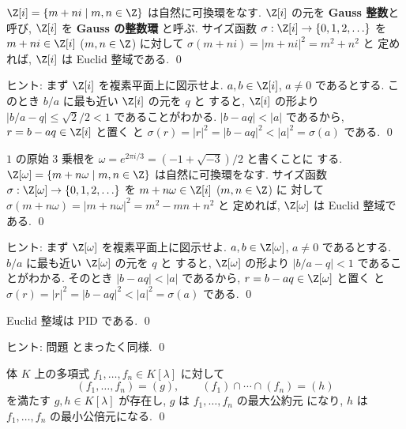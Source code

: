 \documentclass[12pt,twoside]{jarticle}
\begin{document}

\begin{question}
\label{q:Z[i]-Euclidean}
  $\Z[i]=\{m+ni\mid m,n\in\Z\}$ は自然に可換環をなす.
  $\Z[i]$ の元を {\bf Gauss 整数}と呼び, 
  $\Z[i]$ を {\bf Gauss の整数環} と呼ぶ.
  サイズ函数 $\sigma:\Z[i]\to\{0,1,2,\ldots\}$ 
  を $m+ni\in\Z[i]$ ($m,n\in\Z$) に対して $\sigma(m+ni)=|m+ni|^2=m^2+n^2$ と
  定めれば, $\Z[i]$ は Euclid 整域である.
  \qed
\end{question}

\noindent
ヒント: まず $\Z[i]$ を複素平面上に図示せよ.
$a,b\in\Z[i]$, $a\ne 0$ であるとする. 
このとき $b/a$ に最も近い $\Z[i]$ の元を $q$ と
すると, $\Z[i]$ の形より $|b/a - q|\le \sqrt{2}/2<1$ であることがわかる.
$|b-aq|<|a|$ であるから, $r=b-aq\in\Z[i]$ と置く
と $\sigma(r)=|r|^2=|b-aq|^2<|a|^2=\sigma(a)$ である.
\qed


\begin{question}
\label{q:Z[omega]-Euclidean}
  $1$ の原始 $3$ 乗根を $\omega=e^{2\pi i/3}=(-1+\sqrt{-3})/2$ と書くことに
  する.  $\Z[\omega]=\{m+n\omega\mid m,n\in\Z\}$ は自然に可換環をなす.
  サイズ函数 $\sigma:\Z[\omega]\to\{0,1,2,\ldots\}$ 
  を $m+n\omega\in\Z[i]$ ($m,n\in\Z$) に
  対して $\sigma(m+n\omega)=|m+n\omega|^2=m^2-mn+n^2$ と
  定めれば, $\Z[\omega]$ は Euclid 整域である.
  \qed
\end{question}

\noindent
ヒント: まず $\Z[\omega]$ を複素平面上に図示せよ.
$a,b\in\Z[\omega]$, $a\ne 0$ であるとする. 
$b/a$ に最も近い $\Z[\omega]$ の元を $q$ と
すると, $\Z[\omega]$ の形より $|b/a - q|<1$ であることがわかる.
そのとき $|b-aq|<|a|$ であるから, $r=b-aq\in\Z[\omega]$ と置く
と $\sigma(r)=|r|^2=|b-aq|^2<|a|^2=\sigma(a)$ である.
\qed


\begin{question}[Euclid整域はPID]
  Euclid 整域は PID である. \qed
\end{question}

\noindent
ヒント: 問題  とまったく同様.
\qed


\begin{question}
\label{q:gcd-lcm-K[x]}
  体 $K$ 上の多項式 $f_1,\dots,f_n\in K[\lambda]$ に対して
  \begin{equation*}
    (f_1,\dots,f_n) = (g),
    \qquad
    (f_1)\cap\cdots\cap(f_n) = (h)
  \end{equation*}
  を満たす $g,h\in K[\lambda]$ が存在し, $g$ は $f_1,\dots,f_n$ の最大公約元
  になり, $h$ は $f_1,\dots,f_n$ の最小公倍元になる.
  \qed
\end{question}
\end{document}
